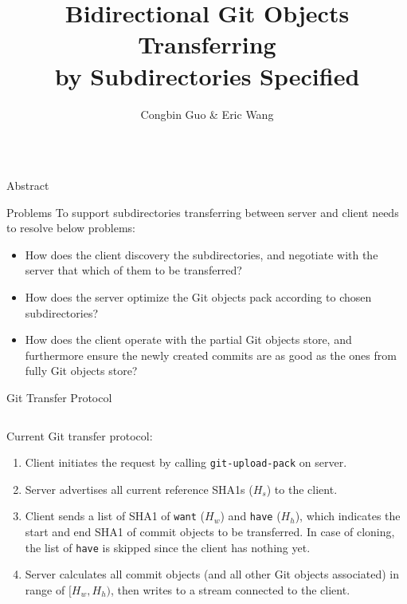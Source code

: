 \documentclass[final]{beamer}
\title{Bidirectional Git Objects Transferring\\ by Subdirectories Specified}
\author{Congbin Guo \& Eric Wang}
\institute{VMware Inc.}
\begin{document}
\begin{frame}[t]
  \begin{columns}[t]
    \begin{column}{.5\linewidth}
      \begin{block}{Abstract}
        
      \end{block}
      \begin{block}{Problems}
To support subdirectories transferring between server and client needs to
resolve below problems:
\begin{itemize}
  \item How does the client discovery the subdirectories, and negotiate with
      the server that which of them to be transferred?

  \item How does the server optimize the Git objects pack according to chosen
      subdirectories?

  \item How does the client operate with the partial Git objects store, and
      furthermore ensure the newly created commits are as good as the ones
      from fully Git objects store?
\end{itemize}
      \end{block}
      \begin{block}{Git Transfer Protocol}
        \begin{columns}[T]
          \begin{column}{.5\textwidth}
            Current Git transfer protocol:
\begin{enumerate}
  \item Client initiates the request by calling \verb|git-upload-pack| on
    server.

  \item Server advertises all current reference SHA1s ($H_s$) to the client.

  \item Client sends a list of SHA1 of \verb|want| ($H_w$) and \verb|have|
    ($H_h$), which indicates the start and end SHA1 of commit objects to be
    transferred.
    In case of cloning, the list of \verb|have| is skipped since the client has
    nothing yet.

  \item Server calculates all commit objects (and all other Git objects
    associated) in range of $[H_w, H_h)$, then writes to a stream connected to
    the client.
\end{enumerate}


\end{column}
\end{columns}
\end{block}
\end{column}
\end{columns}
\end{frame}
\end{document}
